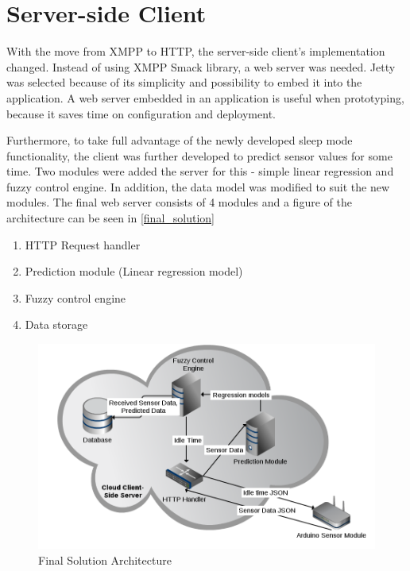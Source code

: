 \section{Server-side Client}

With the move from XMPP to HTTP, the server-side client's implementation changed. Instead of using XMPP Smack library, a web server was needed. Jetty was selected because of its simplicity and possibility to embed it into the application. A web server embedded in an application is useful when prototyping, because it saves time on configuration and deployment. 

Furthermore, to take full advantage of the newly developed sleep mode functionality, the client was further developed to predict sensor values for some time. Two modules were added the server for this - simple linear regression and fuzzy control engine. In addition, the data model was modified to suit the new modules. The final web server consists of 4 modules and a figure of the architecture can be seen in \autoref{final_solution}

\begin{enumerate}
\item HTTP Request handler
\item Prediction module (Linear regression model)
\item Fuzzy control engine
\item Data storage
\end{enumerate}

\begin{figure}[h!]
\centering
\includegraphics[scale=0.46]{4/figures/finalsolution.png}
\caption{Final Solution Architecture}
\label{final_solution}
\end{figure}

